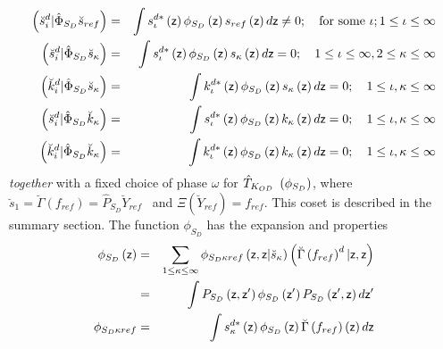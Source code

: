 \begin{eqnarray}
\left( \breve{s}_{i}^{d}|\hat{\Phi}_{S_{D}}\breve{s}_{ref}\right) &=&\int
s_{\iota }^{d\ast }\left( {\sf z}\right) \phi _{S_{D}}\left( {\sf z}\right)
s_{ref}\left( {\sf z}\right) d{\sf z}\neq 0;\quad \text{for some }\iota
;1\leq \iota \leq \infty  \nonumber \\
\left( \breve{s}_{i}^{d}|\hat{\Phi}_{S_{D}}\breve{s}_{\kappa }\right)
&=&\int s_{\iota }^{d\ast }\left( {\sf z}\right) \phi _{S_{D}}\left( {\sf z}%
\right) s_{\kappa }\left( {\sf z}\right) d{\sf z}=0;\quad 1\leq \iota \leq
\infty ,2\leq \kappa \leq \infty  \nonumber \\
\left( \breve{k}_{i}^{d}|\hat{\Phi}_{S_{D}}\breve{s}_{\kappa }\right)
&=&\int k_{\iota }^{d\ast }\left( {\sf z}\right) \phi _{S_{D}}\left( {\sf z}%
\right) s_{\kappa }\left( {\sf z}\right) d{\sf z}=0;\quad 1\leq \iota
,\kappa \leq \infty  \nonumber \\
\left( \breve{s}_{i}^{d}|\hat{\Phi}_{S_{D}}\breve{k}_{\kappa }\right)
&=&\int s_{\iota }^{d\ast }\left( {\sf z}\right) \phi _{S_{D}}\left( {\sf z}%
\right) k_{\kappa }\left( {\sf z}\right) d{\sf z}=0;\quad 1\leq \iota
,\kappa \leq \infty  \nonumber \\
\left( \breve{k}_{i}^{d}|\hat{\Phi}_{S_{D}}\breve{k}_{\kappa }\right)
&=&\int k_{\iota }^{d\ast }\left( {\sf z}\right) \phi _{S_{D}}\left( {\sf z}%
\right) k_{\kappa }\left( {\sf z}\right) d{\sf z}=0;\quad 1\leq \iota
,\kappa \leq \infty
\end{eqnarray}%
{\it together} with a fixed choice of phase $\omega $ for $\hat{T}_{K_{OD}%
{\rm \ }}\left( \phi _{S_{D}}\right) $, where $\breve{s}_{1}=\breve{\Gamma}%
\left( f_{ref}\right) =\hat{P}_{S_{D}}\breve{Y}_{ref}$ \ and $\Xi \left( 
\breve{Y}_{ref}\right) =f_{ref}$. This coset is described in the summary
section. The function $\phi _{S_{D}}$ has the expansion and properties 
\begin{eqnarray}
\phi _{S_{D}}\left( {\sf z}\right) &=&\sum_{1\leq \kappa \leq \infty }\phi
_{S_{D}\kappa ref}\left( {\sf z},{\sf z}|\breve{s}_{\kappa }\right) \left( 
\breve{\Gamma}\left( f_{ref}\right) ^{d}|{\sf z},{\sf z}\right)  \nonumber \\
&=&\int P_{S_{D}}\left( {\sf z},{\sf z}^{\prime }\right) \phi _{S_{D}}\left( 
{\sf z}^{\prime }\right) P_{S_{D}}\left( {\sf z}^{\prime },{\sf z}\right) d%
{\sf z}^{\prime }  \nonumber \\
\phi _{S_{D}\kappa ref} &=&\int s_{\kappa }^{d\ast }\left( {\sf z}\right)
\phi _{S_{D}}\left( {\sf z}\right) \breve{\Gamma}\left( f_{ref}\right)
\left( {\sf z}\right) d{\sf z}
\end{eqnarray}%
